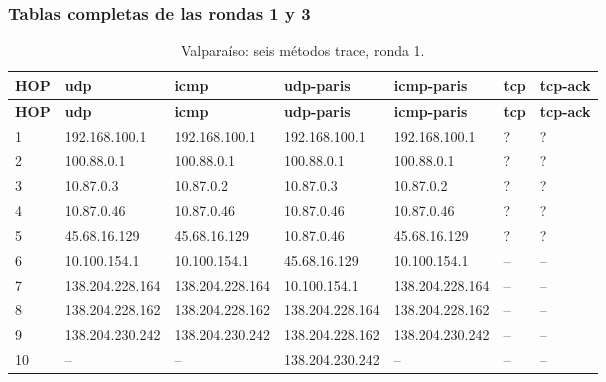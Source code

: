 \subsubsection{Tablas completas de las rondas 1 y 3}
\begingroup
\fontsize{8}{10}\selectfont
\begin{longtable}{p{0.8cm}p{2.25cm}p{2.25cm}p{2.25cm}p{2.25cm}p{2.25cm}p{2.25cm}}
\caption{Valparaíso: seis métodos trace, ronda 1.}\label{anexo:trace:138.204.230.242:1} \\
\toprule
\textbf{HOP} & \textbf{udp} & \textbf{icmp} & \textbf{udp-paris} & \textbf{icmp-paris} & \textbf{tcp} & \textbf{tcp-ack} \\ \midrule
\endfirsthead
\toprule
\textbf{HOP} & \textbf{udp} & \textbf{icmp} & \textbf{udp-paris} & \textbf{icmp-paris} & \textbf{tcp} & \textbf{tcp-ack} \\ \midrule
\endhead
1 & 192.168.100.1 & 192.168.100.1 & 192.168.100.1 & 192.168.100.1 & ? & ? \\
2 & 100.88.0.1 & 100.88.0.1 & 100.88.0.1 & 100.88.0.1 & ? & ? \\
3 & 10.87.0.3 & 10.87.0.2 & 10.87.0.3 & 10.87.0.2 & ? & ? \\
4 & 10.87.0.46 & 10.87.0.46 & 10.87.0.46 & 10.87.0.46 & ? & ? \\
5 & 45.68.16.129 & 45.68.16.129 & 10.87.0.46 & 45.68.16.129 & ? & ? \\
6 & 10.100.154.1 & 10.100.154.1 & 45.68.16.129 & 10.100.154.1 & -- & -- \\
7 & 138.204.228.164 & 138.204.228.164 & 10.100.154.1 & 138.204.228.164 & -- & -- \\
8 & 138.204.228.162 & 138.204.228.162 & 138.204.228.164 & 138.204.228.162 & -- & -- \\
9 & 138.204.230.242 & 138.204.230.242 & 138.204.228.162 & 138.204.230.242 & -- & -- \\
10 & -- & -- & 138.204.230.242 & -- & -- & -- \\
\bottomrule
\end{longtable}
\endgroup
\begingroup
\fontsize{9}{11}\selectfont
